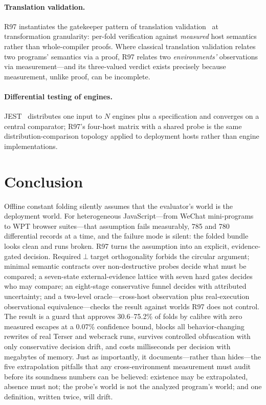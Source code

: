 \documentclass[sigconf,nonacm]{acmart}
\begin{document}
\paragraph{Translation validation.} R97 instantiates the gatekeeper pattern of translation validation~\cite{pnueli} at transformation granularity: per-fold verification against \emph{measured} host semantics rather than whole-compiler proofs. Where classical translation validation relates two programs' semantics via a proof, R97 relates two \emph{environments'} observations via measurement---and its three-valued verdict exists precisely because measurement, unlike proof, can be incomplete.

\paragraph{Differential testing of engines.} JEST~\cite{jest} distributes one input to $N$ engines plus a specification and converges on a central comparator; R97's four-host matrix with a shared probe is the same distribution-comparison topology applied to deployment hosts rather than engine implementations.

\section{Conclusion}\label{sec:conclusion}

Offline constant folding silently assumes that the evaluator's world is the deployment world. For heterogeneous JavaScript---from WeChat mini-programs to WPT browser suites---that assumption fails measurably, 785 and 780 differential records at a time, and the failure mode is silent: the folded bundle looks clean and runs broken. R97 turns the assumption into an explicit, evidence-gated decision. Required$\perp$target orthogonality forbids the circular argument; minimal semantic contracts over non-destructive probes decide what must be compared; a seven-state external-evidence lattice with seven hard gates decides who may compare; an eight-stage conservative funnel decides with attributed uncertainty; and a two-level oracle---cross-host observation plus real-execution observational equivalence---checks the result against worlds R97 does not control. The result is a guard that approves 30.6--75.2\% of folds by calibre with zero measured escapes at a 0.07\% confidence bound, blocks all behavior-changing rewrites of real Terser and webcrack runs, survives controlled obfuscation with only conservative decision drift, and costs milliseconds per decision with megabytes of memory. Just as importantly, it documents---rather than hides---the five extrapolation pitfalls that any cross-environment measurement must audit before its soundness numbers can be believed: existence may be extrapolated, absence must not; the probe's world is not the analyzed program's world; and one definition, written twice, will drift.
\end{document}
